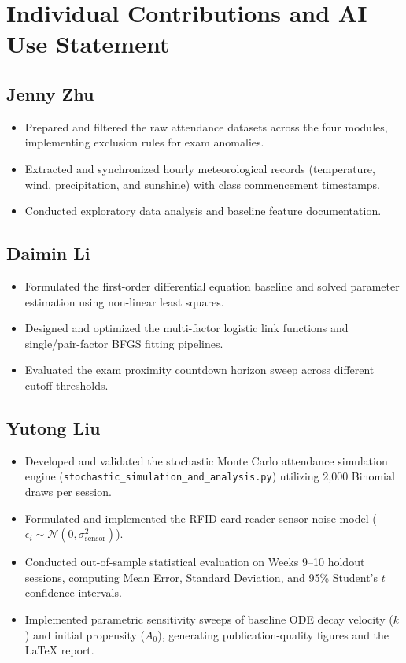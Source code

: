 \documentclass{article}
\begin{document}
\section*{Individual Contributions and AI Use Statement}

\subsection*{Jenny Zhu}
\begin{itemize}
    \item Prepared and filtered the raw attendance datasets across the four modules, implementing exclusion rules for exam anomalies.
    \item Extracted and synchronized hourly meteorological records (temperature, wind, precipitation, and sunshine) with class commencement timestamps.
    \item Conducted exploratory data analysis and baseline feature documentation.
\end{itemize}

\subsection*{Daimin Li}
\begin{itemize}
    \item Formulated the first-order differential equation baseline and solved parameter estimation using non-linear least squares.
    \item Designed and optimized the multi-factor logistic link functions and single/pair-factor BFGS fitting pipelines.
    \item Evaluated the exam proximity countdown horizon sweep across different cutoff thresholds.
\end{itemize}

\subsection*{Yutong Liu}
\begin{itemize}
    \item Developed and validated the stochastic Monte Carlo attendance simulation engine (\texttt{stochastic\_simulation\_and\_analysis.py}) utilizing 2,000 Binomial draws per session.
    \item Formulated and implemented the RFID card-reader sensor noise model ($\epsilon_i \sim \mathcal{N}(0, \sigma_{\mathrm{sensor}}^2)$).
    \item Conducted out-of-sample statistical evaluation on Weeks 9--10 holdout sessions, computing Mean Error, Standard Deviation, and 95\% Student's $t$ confidence intervals.
    \item Implemented parametric sensitivity sweeps of baseline ODE decay velocity ($k$) and initial propensity ($A_0$), generating publication-quality figures and the LaTeX report.
\end{itemize}
\end{document}
